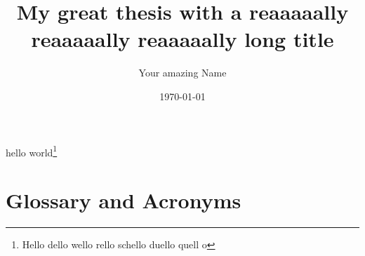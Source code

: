 \documentclass[
	verbose,
	english,
	type=bachelor-thesis, %
	paper=a4,  %
]{thesis}
\title{My great thesis with a reaaaaally reaaaaally reaaaaally long title}
\author{Your amazing Name}
\date{\today}
\begin{document}
\hideindraft{
	\frontmatter
		\maketitle
	
		
		
	
		\tableofcontents
		\listoffigures
		\listoftables
	}
	
	\mainmatter
	
	
	
	
	
	
	
	hello world\footnote{\the\marginparwidth Hello dello wello rello schello duello quell o} %

	\cite{DBLP:conf/msr/SihlerPSTDD24}

	\backmatter
	\printbibliography

	\let\clearpage\newpage
	\let\cleardoublepage\newpage
	\chapter{Glossary and Acronyms}
	\printglossaries

	\makedeclarationofauthenticity %
\end{document}
